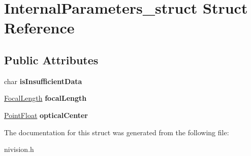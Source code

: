 \hypertarget{structInternalParameters__struct}{
\section{InternalParameters\_\-struct Struct Reference}
\label{structInternalParameters__struct}
}
\subsection*{Public Attributes}
\begin{DoxyCompactItemize}
\item 
\hypertarget{structInternalParameters__struct_a5309e923520ab3ca8bde0adf30958233}{
char {\bfseries isInsufficientData}}
\label{structInternalParameters__struct_a5309e923520ab3ca8bde0adf30958233}

\item 
\hypertarget{structInternalParameters__struct_a55551f7a839a09d8d35b6aeb69a87b7b}{
\hyperlink{structFocalLength__struct}{FocalLength} {\bfseries focalLength}}
\label{structInternalParameters__struct_a55551f7a839a09d8d35b6aeb69a87b7b}

\item 
\hypertarget{structInternalParameters__struct_a5a61fdd0dbc6e12a7ebdecfb9bf2be74}{
\hyperlink{structPointFloat__struct}{PointFloat} {\bfseries opticalCenter}}
\label{structInternalParameters__struct_a5a61fdd0dbc6e12a7ebdecfb9bf2be74}

\end{DoxyCompactItemize}


The documentation for this struct was generated from the following file:\begin{DoxyCompactItemize}
\item 
nivision.h\end{DoxyCompactItemize}
